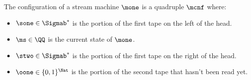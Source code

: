 \begin{defn}
The configuration of a stream machine $\mone$ is a quadruple $\mcnf$ where:
\begin{itemize}
\item $\sone \in \Sigmab^*$ is the portion of the first tape on the left of the head.
\item $\ms \in \QQ$ is the current state of $\mone$.
\item $\stwo \in \Sigmab^*$ is the portion of the first tape on the right of the head.
\item $\oone \in \{0,1\}^\Nat$ is the portion of the second tape that hasn't been read yet.
\end{itemize}
\end{defn}

\begin{comment}
\begin{defn}[Stream Machine Reachability relation]
Given a stream machine $\genm$, we define the transition relation $\rcs\TT$ between two configuration of $\mcan$ as the smallest relation closed by the following rules:
\begin{align*}
\langle \ms, \mc, \msf, \mcf, R, \epsilon \rangle \in \TT &\to \langle \sone, \ms, \mc \stwo, \oone\rangle \rcs\TT \langle \sone\mcf, \msf, \stwo, \oone\rangle\\
\langle \ms, \mc, \msf, \mcf, L, \epsilon \rangle \in \TT &\to \langle \sone \mc, \ms, \stwo, \oone\rangle \rcs\TT \langle \sone, \msf,\mcf \stwo, \oone\rangle\\
\langle \ms, \mc, \msf, \mcf, R, \zero \rangle \in \TT &\to \langle \sone, \ms, \mc \stwo, \zero\oone\rangle \rcs\TT \langle \sone\mcf, \msf, \stwo, \oone\rangle\\
\langle \ms, \mc, \msf, \mcf, L, \zero \rangle \in \TT &\to \langle \sone \mc, \ms, \stwo, \zero\oone\rangle \rcs\TT \langle \sone, \msf,\mcf \stwo, \oone\rangle\\
\langle \ms, \mc, \msf, \mcf, R, \one \rangle \in \TT &\to \langle \sone, \ms, \mc \stwo, \one\oone\rangle \rcs\TT \langle \sone\mcf, \msf, \stwo, \oone\rangle\\
\langle \ms, \mc, \msf, \mcf, L, \one \rangle \in \TT &\to \langle \sone \mc, \ms, \stwo, \one\oone\rangle \rcs\TT \langle \sone, \msf,\mcf \stwo, \oone\rangle\\
\end{align*}
\end{defn}
\end{comment}

